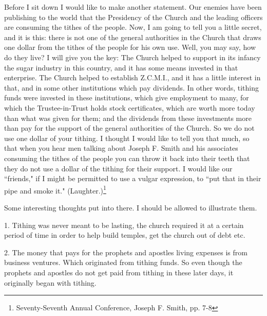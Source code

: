 \begin{displayquote}
Before I sit down I would like to make another statement. Our enemies have been
publishing to the world that the Presidency of the Church and the leading officers
are consuming the tithes of the people. Now, I am going to tell you a little secret,
and it is this: there is not one of the general authorities in the Church that draws
one dollar from the tithes of the people for his own use. Well, you may say, how do
they live? I will give you the key: The Church helped to support in its infancy the
sugar industry in this country, and it has some means invested in that enterprise.
The Church helped to establish Z.C.M.I., and it has a little interest in that, and
in some other institutions which pay dividends. In other words, tithing funds were
invested in these institutions, which give employment to many, for which the
Trustee-in-Trust holds stock certificates, which are worth more today than what was
given for them; and the dividends from these investments more than pay for the
support of the general authorities of the Church. So we do not use one dollar of your
tithing. I thought I would like to tell you that much, so that when you hear men
talking about Joseph F. Smith and his associates consuming the tithes of the people
you can throw it back into their teeth that they do not use a dollar of the tithing
for their support. I would like our ``friends," if I might be permitted to use a
vulgar expression, to ``put that in their pipe and smoke it."
(Laughter.)\footnote{Seventy-Seventh Annual Conference, Joseph F. Smith, pp. 7-8}
\end{displayquote}

Some interesting thoughts put into there. I should be allowed to illustrate them.

1. Tithing was never meant to be lasting, the church required it at a certain period
of time in order to help build temples, get the church out of debt etc.

2. The money that pays for the prophets and apostles living expenses is from business
ventures. Which originated from tithing funds. So even though the prophets and
apostles do not get paid from tithing in these later days, it originally began with
tithing.